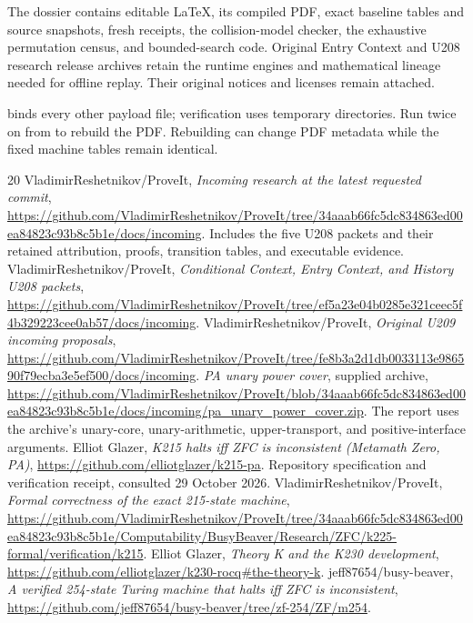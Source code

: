\documentclass[11pt,a4paper]{article}
\newcommand{\file}[1]{\path{#1}}
\begin{document}
The dossier contains editable \LaTeX{}, its compiled PDF, exact baseline
tables and source snapshots, fresh receipts, the collision-model checker,
the exhaustive permutation census, and bounded-search code. Original
Entry Context and U208 research release archives retain the runtime engines
and mathematical lineage needed for offline replay. Their original notices
and licenses remain attached.



\file{MANIFEST.json} binds every other payload file; verification uses
temporary directories. Run \file{pdflatex} twice on \file{report.tex} from
\file{paper/} to rebuild the PDF. Rebuilding can change PDF metadata while
the fixed machine tables remain identical.

\clearpage
\begin{thebibliography}{20}\small
{} VladimirReshetnikov/ProveIt,
\emph{Incoming research at the latest requested commit},
\url{https://github.com/VladimirReshetnikov/ProveIt/tree/34aaab66fc5dc834863ed00ea84823c93b8c5b1e/docs/incoming}.
Includes the five U208 packets and their retained attribution, proofs,
transition tables, and executable evidence.
 VladimirReshetnikov/ProveIt,
\emph{Conditional Context, Entry Context, and History U208 packets},
\url{https://github.com/VladimirReshetnikov/ProveIt/tree/ef5a23e04b0285e321ceec5f4b329223cee0ab57/docs/incoming}.
 VladimirReshetnikov/ProveIt,
\emph{Original U209 incoming proposals},
\url{https://github.com/VladimirReshetnikov/ProveIt/tree/fe8b3a2d1db0033113e986590f79ecba3e5ef500/docs/incoming}.
 \emph{PA unary power cover}, supplied archive,
\url{https://github.com/VladimirReshetnikov/ProveIt/blob/34aaab66fc5dc834863ed00ea84823c93b8c5b1e/docs/incoming/pa_unary_power_cover.zip}.
The report uses the archive's unary-core, unary-arithmetic,
upper-transport, and positive-interface arguments.
 Elliot Glazer, \emph{K215 halts iff ZFC is inconsistent
(Metamath Zero, PA)}, \url{https://github.com/elliotglazer/k215-pa}.
Repository specification and verification receipt, consulted 29 October 2026.
 VladimirReshetnikov/ProveIt,
\emph{Formal correctness of the exact 215-state machine},
\url{https://github.com/VladimirReshetnikov/ProveIt/tree/34aaab66fc5dc834863ed00ea84823c93b8c5b1e/Computability/BusyBeaver/Research/ZFC/k225-formal/verification/k215}.
 Elliot Glazer, \emph{Theory K and the K230 development},
\url{https://github.com/elliotglazer/k230-rocq#the-theory-k}.
 jeff87654/busy-beaver, \emph{A verified 254-state Turing
machine that halts iff ZFC is inconsistent},
\url{https://github.com/jeff87654/busy-beaver/tree/zf-254/ZF/m254}.
\end{thebibliography}
\end{document}
